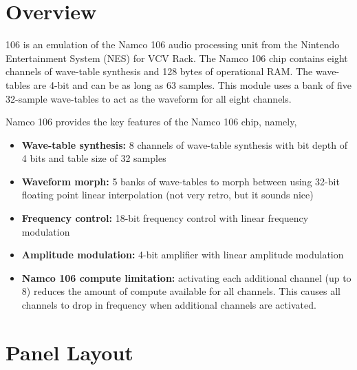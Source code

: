 \documentclass[12pt,a4paper]{article}
\begin{document}
\section{Overview}

106 is an emulation of the Namco 106 audio processing unit from the Nintendo Entertainment System (NES) for VCV Rack. The Namco 106 chip contains eight channels of wave-table synthesis and 128 bytes of operational RAM. The wave-tables are 4-bit and can be as long as 63 samples. This module uses a bank of five 32-sample wave-tables to act as the waveform for all eight channels.

Namco 106 provides the key features of the Namco 106 chip, namely,
\begin{itemize}
  \item \textbf{Wave-table synthesis:} 8 channels of wave-table synthesis with bit depth of 4 bits and table size of 32 samples
  \item \textbf{Waveform morph:} 5 banks of wave-tables to morph between using 32-bit floating point linear interpolation (not very retro, but it sounds nice)
  \item \textbf{Frequency control:} 18-bit frequency control with linear frequency modulation
  \item \textbf{Amplitude modulation:} 4-bit amplifier with linear amplitude modulation
  \item \textbf{Namco 106 compute limitation:} activating each additional channel (up to 8) reduces the amount of compute available for all channels. This causes all channels to drop in frequency when additional channels are activated.
\end{itemize}


\section{Panel Layout}
\end{document}

